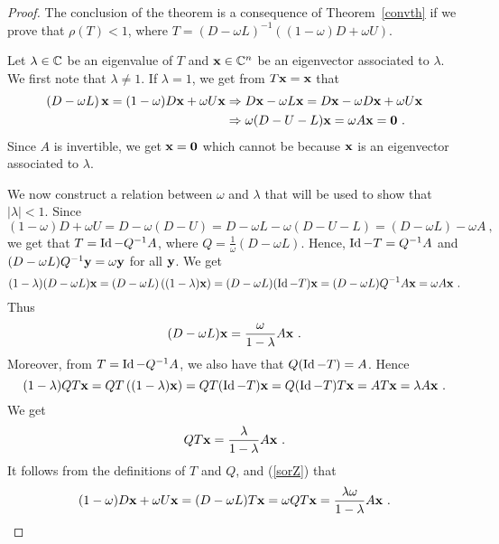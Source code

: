 \begin{proof}
The conclusion of the theorem is a consequence of Theorem~\ref{convth}
if we prove that $\rho(T)<1$, where
$T = (D-\omega L)^{-1}((1-\omega)D + \omega U)$.

Let $\lambda \in \mathbb{C}$ be an eigenvalue of $T$ and $\mathbf{x} \in \mathbb{C}^n$
be an eigenvector associated to $\lambda$.  We first note that
$\lambda \neq 1$.  If $\lambda = 1$, we get from $T\mathbf{x} = \mathbf{x}$
that
\begin{align*}
\left(D - \omega L\right) \mathbf{x} = (1-\omega)D \mathbf{x} + \omega U \mathbf{x}
&\Rightarrow 
D\mathbf{x} - \omega L \mathbf{x} = D\mathbf{x} - \omega D \mathbf{x} + \omega U
\mathbf{x} \\
&\Rightarrow
\omega ( D - U - L)\mathbf{x} = \omega A \mathbf{x} = \mathbf{0} \ .
\end{align*}
Since $A$ is invertible, we get $\mathbf{x} = \mathbf{0}$ which cannot be
because $\mathbf{x}$ is an eigenvector associated to $\lambda$.

We now construct a relation between $\omega$ and $\lambda$ that will
be used to show that $|\lambda| < 1$.  Since
\[
  (1-\omega)D + \omega U = D - \omega(D -U)
  = D - \omega L - \omega ( D - U - L) = (D - \omega L) - \omega A \ ,
\]
we get that $T = \operatorname{Id} - Q^{-1}A$, where
$\displaystyle Q = \frac{1}{\omega}(D-\omega L)$.
Hence, $\operatorname{Id} - T = Q^{-1}A$ and
$(D-\omega L)Q^{-1} \mathbf{y} = \omega \mathbf{y}$ for all $\mathbf{y}$.
We get
\[
(1-\lambda) (D-\omega L) \mathbf{x}
= (D - \omega L)\left( (1-\lambda) \mathbf{x} \right)
= (D - \omega L)(\operatorname{Id} - T)\mathbf{x}
= (D - \omega L) Q^{-1}A\mathbf{x}
= \omega A\mathbf{x} \ .
\]
Thus
\begin{equation}\label{sorA}
  (D-\omega L) \mathbf{x} = \frac{\omega}{1-\lambda} A\mathbf{x} \ .
\end{equation}
Moreover, from $T = \operatorname{Id} - Q^{-1}A$, we also have that
$Q(\operatorname{Id} - T) = A$.  Hence
\[
(1-\lambda) QT\mathbf{x}
=  QT\left( (1-\lambda)\mathbf{x}\right)
= QT(\operatorname{Id} - T)\mathbf{x} = Q(\operatorname{Id} - T)T\mathbf{x}
= AT\mathbf{x} = \lambda A \mathbf{x} \ .
\]
We get
\begin{equation}\label{sorZ}
QT\mathbf{x} = \frac{\lambda}{1-\lambda} A \mathbf{x} \ .
\end{equation}
It follows from the definitions of $T$ and $Q$, and (\ref{sorZ}) that
\begin{equation}\label{sorB}
(1-\omega)D\VEC{x} + \omega U\VEC{x} = (D-\omega L)T\VEC{x}
= \omega QT\VEC{x} = \frac{\lambda \omega}{1-\lambda} A\VEC{x} \ .
\end{equation}


\end{proof}
